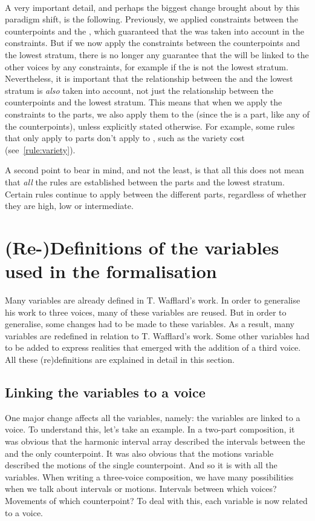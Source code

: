 \paragraph{}
A very important detail, and perhaps the biggest change brought about by this paradigm shift, is the following. Previously, we applied constraints between the counterpoints and the \cf, which guaranteed that the \cfs was taken into account in the constraints. But if we now apply the constraints between the counterpoints and the lowest stratum, there is no longer any guarantee that the \cfs will be linked to the other voices by any constraints, for example if the \cfs is not the lowest stratum. Nevertheless, it is important that the relationship between the \cfs and the lowest stratum is \textit{also} taken into account, not just the relationship between the counterpoints and the lowest stratum. This means that when we apply the constraints to the parts, we also apply them to the \cfs (since the \cfs is a part, like any of the counterpoints), unless explicitly stated otherwise. For example, some rules that only apply to parts don't apply to \cfs, such as the variety cost (see~\ref{rule:variety}).

A second point to bear in mind, and not the least, is that all this does not mean that \textit{all} the rules are established between the parts and the lowest stratum. Certain rules continue to apply between the different parts, regardless of whether they are high, low or intermediate.

\section{(Re-)Definitions of the variables used in the formalisation} \label{section:changes induced}
Many variables are already defined in T. Wafflard's work. In order to generalise his work to three voices, many of these variables are reused. But in order to generalise, some changes had to be made to these variables. As a result, many variables are redefined in relation to T. Wafflard's work. Some other variables had to be added to express realities that emerged with the addition of a third voice. All these (re)definitions are explained in detail in this section.

\subsection{Linking the variables to a voice}
One major change affects all the variables, namely: the variables are linked to a voice. To understand this, let's take an example. In a two-part composition, it was obvious that the harmonic interval array described the intervals between the \cfs and the only counterpoint. It was also obvious that the motions variable described the motions of the single counterpoint. And so it is with all the variables. When writing a three-voice composition, we have many possibilities when we talk about intervals or motions. Intervals between which voices? Movements of which counterpoint? To deal with this, each variable is now related to a voice.

